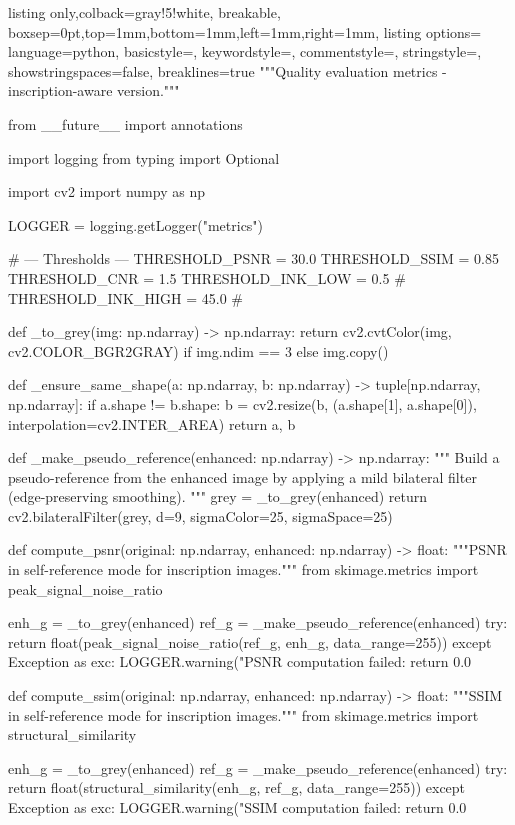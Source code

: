 \begin{tcblisting}{listing only,colback=gray!5!white, breakable, boxsep=0pt,top=1mm,bottom=1mm,left=1mm,right=1mm,
listing options={
language=python,
basicstyle=\footnotesize\ttfamily,
keywordstyle=\color{blue},
commentstyle=\color{gray},
stringstyle=\color{purple},
showstringspaces=false,
breaklines=true
}}
"""Quality evaluation metrics - inscription-aware version."""

from __future__ import annotations

import logging
from typing import Optional

import cv2
import numpy as np

LOGGER = logging.getLogger("metrics")

# --- Thresholds ---
THRESHOLD_PSNR        = 30.0
THRESHOLD_SSIM        = 0.85
THRESHOLD_CNR         = 1.5
THRESHOLD_INK_LOW     = 0.5    # %
THRESHOLD_INK_HIGH    = 45.0   # %


def _to_grey(img: np.ndarray) -> np.ndarray:
    return cv2.cvtColor(img, cv2.COLOR_BGR2GRAY) if img.ndim == 3 else img.copy()


def _ensure_same_shape(a: np.ndarray, b: np.ndarray) -> tuple[np.ndarray, np.ndarray]:
    if a.shape != b.shape:
        b = cv2.resize(b, (a.shape[1], a.shape[0]), interpolation=cv2.INTER_AREA)
    return a, b


def _make_pseudo_reference(enhanced: np.ndarray) -> np.ndarray:
    """
    Build a pseudo-reference from the enhanced image by applying a mild
    bilateral filter (edge-preserving smoothing).
    """
    grey = _to_grey(enhanced)
    return cv2.bilateralFilter(grey, d=9, sigmaColor=25, sigmaSpace=25)


def compute_psnr(original: np.ndarray, enhanced: np.ndarray) -> float:
    """PSNR in self-reference mode for inscription images."""
    from skimage.metrics import peak_signal_noise_ratio

    enh_g = _to_grey(enhanced)
    ref_g = _make_pseudo_reference(enhanced)
    try:
        return float(peak_signal_noise_ratio(ref_g, enh_g, data_range=255))
    except Exception as exc:
        LOGGER.warning("PSNR computation failed: %
        return 0.0


def compute_ssim(original: np.ndarray, enhanced: np.ndarray) -> float:
    """SSIM in self-reference mode for inscription images."""
    from skimage.metrics import structural_similarity

    enh_g = _to_grey(enhanced)
    ref_g = _make_pseudo_reference(enhanced)
    try:
        return float(structural_similarity(enh_g, ref_g, data_range=255))
    except Exception as exc:
        LOGGER.warning("SSIM computation failed: %
        return 0.0



\end{tcblisting}
